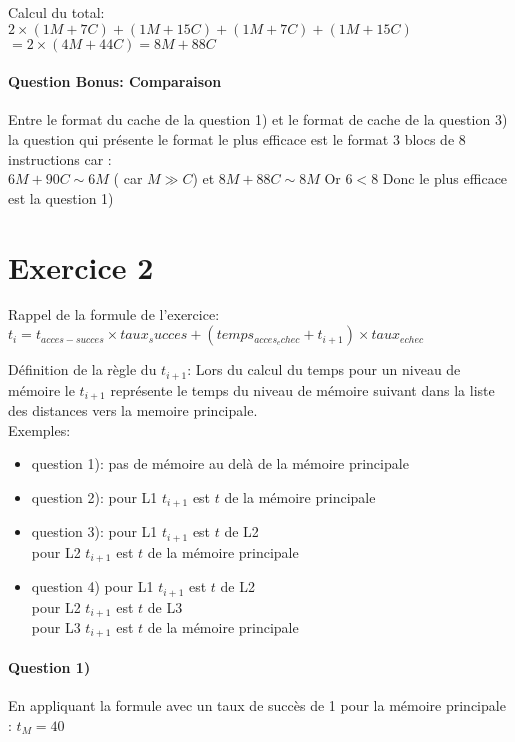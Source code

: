 \documentclass[12pt]{report}
\newcommand{\ns}{\\\indent\indent\vspace{0.25cm}}
\begin{document}
Calcul du total: $2 \times (1M +7C) + (1M + 15C) + (1M + 7C) + (1M+15C)$ \\
$=2 \times  (4M + 44C) = 8M + 88C$ \\

\paragraph*{Question Bonus: Comparaison}
Entre le format du cache de la question 1) et le format de cache de la question 3) la question qui présente le format le plus efficace est le format 3 blocs de 8 instructions  car :\\
$6 M + 90C  \sim 6M$ ( car $M \gg C$) et $8M + 88C \sim 8M$
Or $6 < 8 $
Donc le plus efficace est la question 1) 
\section{Exercice 2}

Rappel de la formule de l'exercice:\\
 $t_i = t_{acces-succes} \times taux_succes + (temps_{acces_echec} + t_{i+1}) \times taux_{echec}$
 \ns 
 
 Définition de la règle du $t_{i+1}$: Lors du calcul du temps pour un niveau de mémoire  le $t_{i+1}$ représente le temps du niveau de mémoire suivant dans la liste des distances vers la memoire principale.\\
 Exemples:
 \begin{itemize}
 	\item question 1): pas de mémoire au delà de la mémoire principale
 	\item question 2): pour L1 $t_{i+1}$ est $t$ de  la mémoire principale
 	\item question 3): pour L1 $t_{i+1}$ est  $t$ de L2\\
 									  pour L2 $t_{i+1}$ est $t$ de la mémoire principale
 	\item question 4) pour L1 $t_{i+1}$  est $t$ de L2\\
 									  pour L2 $t_{i+1}$ est $t$ de L3\\
 									  pour L3 $t_{i+1}$ est $t$ de la mémoire principale 
 \end{itemize}
 
 \paragraph*{Question 1)}
 En appliquant la formule avec un taux de succès de 1 pour la mémoire principale : $ t_M = 40$
 
\end{document}
